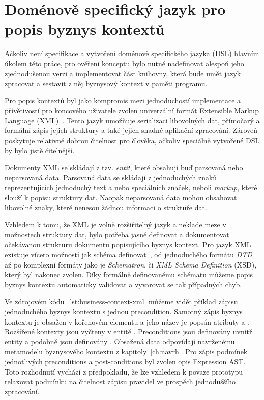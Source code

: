 \section{Doménově specifický jazyk pro popis byznys kontextů}

Ačkoliv není specifikace a vytvoření doménově specifického jazyka (DSL)
hlavním úkolem této práce, pro ověření konceptu bylo nutné nadefinovat
alespoň jeho zjednodušenou verzi a implementovat část knihovny, která
bude umět jazyk zpracovat a sestavit z něj byznysový kontext v paměti programu.

Pro popis kontextů byl jako kompromis mezi jednoduchostí implementace
a přívětivostí pro koncového uživatele zvolen univerzální formát Extensible
Markup Language (XML)~\cite{bray1997extensible}. Tento
jazyk umožňuje serializaci libovolných dat, přímočarý a formální
zápis jejich struktury a také jejich snadné aplikační zpracování.
Zároveň poskytuje relativně dobrou čitelnost pro člověka, ačkoliv
speciálně vytvořené DSL by bylo jistě čitelnější.

Dokumenty XML se skládají z tzv. \textit{entit}, které obsahují
buď parsovaná nebo neparsovaná data. Parsovaná data se skládají
z jednoduchých znaků reprezentujících jednoduchý text a nebo
speciálních značek, neboli \textit{markup}, které slouží k popisu
struktury dat. Naopak neparsovaná data mohou obsahovat libovolné
znaky, které nenesou žádnou informaci o struktuře dat.

Vzhledem k tomu, že XML je volně rozšiřitelný jazyk a neklade
meze v možnostech struktury dat, bylo potřeba jasně definovat
a dokumentovat očekávanou strukturu dokumentu popisujícího
byznys kontext. Pro jazyk XML existuje vícero možností jak schéma
definovat~\cite{lee2000comparative}, od jednoduchého formátu
\textit{DTD} až po komplexní formáty jako je \textit{Schematron}, či
\textit{XML Schema Definition} (XSD), který byl nakonec zvolen.
Díky formálně definovanému schématu můžeme popis byznys kontextu
automaticky validovat a vyvarovat se tak případných chyb.

Ve zdrojovém kódu~\ref{lst:business-context-xml} můžeme vidět
příklad zápisu jednoduchého byznys kontextu s jednou precondition.
Samotný zápis byznys kontextu je obsažen v kořenovém elementu
 a jeho název je popsán atributy
 a . Rozšířené kontexty jsou vyčteny
v entitě . Preconditions jsou
definovány uvnitř entity  a podobně
jsou definovány . Obsažená data odpovídají
navrženému metamodelu byznysového kontextu z kapitoly~\ref{ch:navrh}. %
Pro zápis podmínek jednotlivých preconditions a post-conditions byl zvolen
opis Expression AST. Toto rozhodnutí vychází z předpokladu,
že lze vzhledem k povaze prototypu relaxovat podmínku
na čitelnost zápisu pravidel ve prospěch jednoduššího zpracování.

